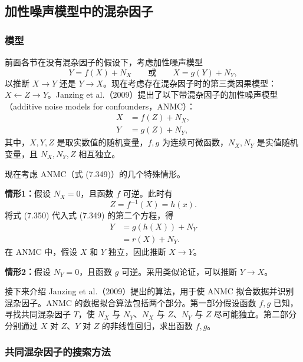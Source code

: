\subsection{加性噪声模型中的混杂因子}
\subsubsection{模型}

前面各节在没有混杂因子的假设下，考虑加性噪声模型
\[
Y=f(X)+N_X\qquad\text{或}\qquad X=g(Y)+N_Y,
\]
以推断 $X\to Y$ 还是 $Y\to X$。现在考虑存在混杂因子时的第三类因果模型：$X\leftarrow Z\to Y$。Janzing et al.（2009）提出了以下带混杂因子的加性噪声模型（additive noise models for confounders，ANMC）：
\begin{equation}
\begin{aligned}
X&=f(Z)+N_X,\\
Y&=g(Z)+N_Y,
\end{aligned}
\tag{7.349}
\end{equation}
其中，$X,Y,Z$ 是取实数值的随机变量，$f,g$ 为连续可微函数，$N_X,N_Y$ 是实值随机变量，且 $N_X,N_Y,Z$ 相互独立。

现在考虑 ANMC（式 (7.349)）的几个特殊情形。

\noindent\textbf{情形1：}假设 $N_X=0$，且函数 $f$ 可逆。此时有
\begin{equation}
Z=f^{-1}(X)=h(x).
\tag{7.350}
\end{equation}
将式 (7.350) 代入式 (7.349) 的第二个方程，得
\begin{equation}
\begin{aligned}
Y&=g(h(X))+N_Y\\
&=r(X)+N_Y.
\end{aligned}
\tag{7.351}
\end{equation}
在 ANMC 中，假设 $X$ 和 $Y$ 独立，因此推断 $X\to Y$。

\noindent\textbf{情形2：}假设 $N_Y=0$，且函数 $g$ 可逆。采用类似论证，可以推断 $Y\to X$。

接下来介绍 Janzing et al.（2009）提出的算法，用于使 ANMC 拟合数据并识别混杂因子。ANMC 的数据拟合算法包括两个部分。第一部分假设函数 $f,g$ 已知，寻找共同混杂因子 $T$，使 $N_X$ 与 $N_Y$、$N_X$ 与 $Z$、$N_Y$ 与 $Z$ 尽可能独立。第二部分分别通过 $X$ 对 $Z$、$Y$ 对 $Z$ 的非线性回归，求出函数 $f,g$。

\subsubsection{共同混杂因子的搜索方法}

